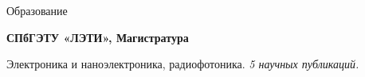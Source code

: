 \begin{rubric}{Образование}

\entry*[2022 - 2024]%
	\textbf{СПбГЭТУ «ЛЭТИ», Магистратура}
	\par Электроника и наноэлектроника, радиофотоника. 
 \emph{5 научных публикаций.}
\end{rubric}